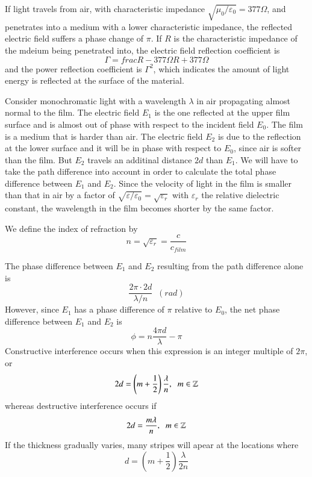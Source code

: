 \documentclass[12pt, a4paper, oneside, openright, titlepage]{book}
\begin{document}
If light travels from air, with characteristic impedance $\sqrt{\mu_0/\varepsilon_0}=377\Omega$, and penetrates into a medium with a lower characteristic impedance, the reflected electric field suffers a phase change of $\pi$. If $R$ is the characteristic impedance of the mdeium being penetrated into, the electric field reflection coefficient is
\begin{equation*}
    \Gamma = frac{R-377\Omega}{R+377\Omega}
\end{equation*}
and the power reflection coefficient is $\Gamma^2$, which indicates the amount of light energy is reflected at the surface of the material. 


Consider monochromatic light with a wavelength $\lambda$ in air propagating almost normal to the film. The electric field $E_1$ is the one reflected at the upper film surface and is almost out of phase with respect to the incident field $E_0$. The film is a medium that is harder than air. The electric field $E_2$ is due to the reflection at the lower surface and it will be in phase with respect to $E_0$, since air is softer than the film. But $E_2$ travels an additinal distance $2d$ than $E_1$. We will have to take the path difference into account in order to calculate the total phase difference between $E_1$ and $E_2$. Since the velocity of light in the film is smaller than that in air by a factor of $\sqrt{\varepsilon/\varepsilon_0} = \sqrt{\varepsilon_r}$ with $\varepsilon_r$ the relative dielectric constant, the wavelength in the film becomes shorter by the same factor.

We define the index of refraction by
\begin{equation*}
    n = \sqrt{\varepsilon_r} = \frac{c}{c_{film}}
\end{equation*}


The phase difference between $E_1$ and $E_2$ resulting from the path difference alone is
\begin{equation*}
    \frac{2\pi\cdot 2d}{\lambda/n}\;\;(rad)
\end{equation*}
However, since $E_1$ has a phase difference of $\pi$ relative to $E_0$, the net phase difference between $E_1$ and $E_2$ is
\begin{equation*}
    \phi = n\frac{4\pi d}{\lambda}-\pi
\end{equation*}
Constructive interference occurs when this expression is an integer multiple of $2\pi$, or
\begin{equation*}
    2d = \left(m+\frac{1}{2}\right)\frac{\lambda}{n},\;\;m \in \mathbb Z
\end{equation*}
whereas destructive interference occurs if
\begin{equation*}
    2d = \frac{m\lambda}{n},\;\;m \in \mathbb Z
\end{equation*}
If the thickness gradually varies, many stripes will apear at the locations where
\begin{equation*}
    d = \left(m+\frac{1}{2}\right)\frac{\lambda}{2n}
\end{equation*}
\end{document}
